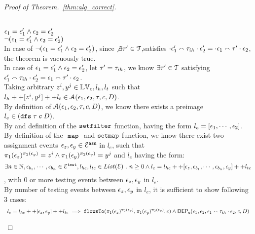 \begin{proof}[Proof of Theorem.~\ref{thm:alg_correct}]
\begin{case}
\\
$\mathtt{\epsilon}_1 = \mathtt{\epsilon}_1' \land  \mathtt{\epsilon}_2 = \mathtt{\epsilon}_2'$
\\
$\neg(\mathtt{\epsilon}_1 = \mathtt{\epsilon}_1' \land  \mathtt{\epsilon}_2 = \mathtt{\epsilon}_2')$
\\
In case of $\neg(\mathtt{\epsilon}_1 = \mathtt{\epsilon}_1' \land  \mathtt{\epsilon}_2 = \mathtt{\epsilon}_2')$, since 
$\not\exists \mathtt{\tau}' \in \mathcal{T}$,satisfies $
\cdot {} \mathtt{\epsilon}_1' {}\smallfrown \mathtt{\tau}_{ih} \cdot {} \mathtt{\epsilon}_2'  = \cdot {} \mathtt{\epsilon}_1 \smallfrown \mathtt{\tau}' \cdot \mathtt{\epsilon}_2$, 
the theorem is vacuously true.
\\
%
In case of $\mathtt{\epsilon}_1 = \mathtt{\epsilon}_1' \land  \mathtt{\epsilon}_2 = \mathtt{\epsilon}_2'$,
let $\mathtt{\tau}' = \mathtt{\tau}_{ih}$, we know $\exists \mathtt{\tau}' \in \mathcal{T}$ satisfying 
$\mathtt{\epsilon}_1'  {}\smallfrown \mathtt{\tau}_{ih} \cdot {} \mathtt{\epsilon}_2' = \mathtt{\epsilon}_1 \smallfrown \mathtt{\tau}' \cdot \mathtt{\epsilon}_2$.
\\
Taking arbitrary $z^i, y^j \in \mathbb{LV}_c, l_h, l_t$ such that 
$l_h ++ [z^i, y^j] ++ l_t \in \mathcal{A}(\mathtt{\epsilon}_1, \mathtt{\epsilon}_2, \mathtt{\tau}, c, D)$.
\\
By definition of $\mathcal{A}(\mathtt{\epsilon}_1, \mathtt{\epsilon}_2, \mathtt{\tau}, c, D)$,
we know there exists a preimage $l_e \in (\mathtt{dfs} \; \mathtt{\tau} \; c \;  D )$.
\\
By and definition of the 
$\mathtt{setfilter}$ function,
having the form $l_e = [\mathtt{\epsilon}_1, \cdots, \mathtt{\epsilon}_2]$. 
\\
By definition of the $~\mathtt{map}~$ and $\mathtt{setmap}$ function, we know there exist 
two assignment events
$\mathtt{\epsilon}_z, \mathtt{\epsilon}_y \in \mathcal{E}^{\mathtt{{asn}}}$ in $l_e$,
such that $ \pi_1(\mathtt{\epsilon}_z)^{\pi_2(\mathtt{\epsilon}_y)} = z^i \land \pi_1(\mathtt{\epsilon}_y)^{\pi_2(\mathtt{\epsilon}_y)} = y^j$
and $l_e$ having the form:
\\
\[
 \exists  n \in \mathbb{N}, \mathtt{\epsilon}_{b_1}, \cdots, \mathtt{\epsilon}_{b_n} \in \mathcal{E}^{\mathtt{{test}}}, l_{he}, l_{te} \in List(\mathcal{E}) ~.~ 
  n \geq 0 \land l_e = l_{he} ++ [\mathtt{\epsilon}_z, \mathtt{\epsilon}_{b_1}, \cdots, \mathtt{\epsilon}_{b_n}, \mathtt{\epsilon}_y] ++ l_{te}
\]
, with $0$ or more testing events between $\mathtt{\epsilon}_z, \mathtt{\epsilon}_y$ in $l_e$.
\\
By number of testing events between $\mathtt{\epsilon}_z, \mathtt{\epsilon}_y$ in $l_e$, it is sufficient to show following 3 cases:
\begin{equation}
\begin{array}{l}
  l_e = l_{he} ++ [\mathtt{\epsilon}_z, \mathtt{\epsilon}_y] ++ l_{te}
   \implies \mathtt{flowsTo}(\pi_1(\mathtt{\epsilon}_z)^{\pi_2(\mathtt{\epsilon}_y)}, \pi_1(\mathtt{\epsilon}_y)^{\pi_2(\mathtt{\epsilon}_y)}, c)
   \land 
   \mathsf{DEP_{\mathtt{e}}}(\mathtt{\epsilon}_1, \mathtt{\epsilon}_2, \mathtt{\epsilon}_1 \smallfrown \mathtt{\tau}_{ih} \cdot \mathtt{\epsilon}_2, {c}, D) 

\end{array}
\end{equation}
\end{case}
\end{proof}
